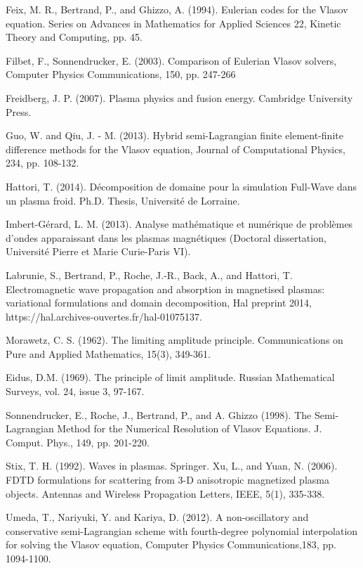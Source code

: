 \documentclass[proc]{edpsmath}
\begin{document}
\begin{thebibliography}{99}
 Feix, M. R., Bertrand, P., and Ghizzo, A.  (1994). Eulerian codes for the Vlasov equation.  Series on Advances
in Mathematics for Applied Sciences 22, Kinetic Theory and Computing, pp. 45.


 Filbet, F., Sonnendrucker, E.  (2003). 
 Comparison of Eulerian Vlasov solvers,
Computer Physics Communications,
150, pp. 247-266

 Freidberg, J. P. (2007). Plasma physics and fusion energy. Cambridge University Press.

Guo, W. and Qiu, J. - M. (2013). 
Hybrid semi-Lagrangian finite element-finite difference methods for the Vlasov
equation,
Journal of Computational Physics,
234, pp. 108-132.

Hattori, T. (2014).
D\'ecomposition de domaine pour la simulation Full-Wave dans un plasma froid.
Ph.D. Thesis, Universit\'e de
Lorraine.

 Imbert-Gérard, L. M. (2013). Analyse mathématique et numérique de problèmes d'ondes apparaissant dans les plasmas magnétiques (Doctoral dissertation, Université Pierre et Marie Curie-Paris VI).




Labrunie, S., Bertrand, P., Roche, J.-R., Back, A., and
Hattori, T. 
Electromagnetic wave propagation and absorption in
magnetised plasmas: variational formulations and
domain decomposition, Hal preprint 2014, https://hal.archives-ouvertes.fr/hal-01075137.




 Morawetz, C. S. (1962). The limiting amplitude principle. Communications on Pure and Applied Mathematics, 15(3), 349-361.

 Eidus, D.M. (1969). The principle of limit amplitude. Russian Mathematical Surveys, vol. 24, issue 3, 97-167.

Sonnendrucker, E., Roche, J., Bertrand, P., and A. Ghizzo (1998). 
The Semi-Lagrangian Method for the
Numerical Resolution of Vlasov Equations.
J. Comput. Phys.,
149, pp. 201-220.

 Stix, T. H. (1992). Waves in plasmas. Springer.
Xu, L., and Yuan, N. (2006). FDTD formulations for scattering from 3-D anisotropic magnetized plasma objects. Antennas and Wireless Propagation Letters, IEEE, 5(1), 335-338.

Umeda, T., Nariyuki, Y. and Kariya, D. (2012).
A non-oscillatory and conservative semi-Lagrangian scheme with
fourth-degree polynomial interpolation for solving the Vlasov equation,
Computer Physics Communications,183, pp. 1094-1100.



\end{thebibliography}
\end{document}

